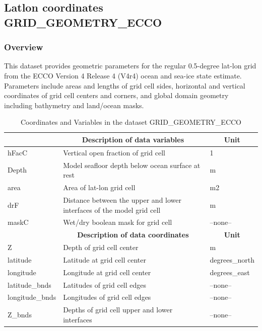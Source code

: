 \subsection{Latlon coordinates GRID\_GEOMETRY\_ECCO}
\newp
\subsubsection{Overview}
This dataset provides geometric parameters for the regular 0.5-degree lat-lon grid from the ECCO Version 4 Release 4 (V4r4) ocean and sea-ice state estimate. Parameters include areas and lengths of grid cell sides, horizontal and vertical coordinates of grid cell centers and corners, and global domain geometry including bathymetry and land/ocean masks. 
\begin{longtable}{|m{}|m{}|m{}|}
\caption{Coordinates and Variables in the dataset GRID\_GEOMETRY\_ECCO}
\label{tab:table-GRID_GEOMETRY_ECCO-fields} \\ 
\hline \endhead \hline \endfoot
\rowcolor{lightgray} \multicolumn{1}{|c|}{\textbf{Variables}} & \multicolumn{1}{|c|}{\textbf{Description of data variables}} &  \multicolumn{1}{|c|}{\textbf{Unit}}\\ \hline
hFacC &Vertical open fraction of grid cell &1  \\ \hline
Depth &Model seafloor depth below ocean surface at rest &m  \\ \hline
area &Area of lat-lon grid cell &m2  \\ \hline
drF &Distance between the upper and lower interfaces of the model grid cell &m  \\ \hline
maskC &Wet/dry boolean mask for grid cell &--none--  \\ \hline
\rowcolor{lightgray} \multicolumn{1}{|c|}{\textbf{Coordinates}} & \multicolumn{1}{|c|}{\textbf{Description of data coordinates}} &  \multicolumn{1}{|c|}{\textbf{Unit}}\\ \hline
Z &Depth of grid cell center &m  \\ \hline
latitude &Latitude at grid cell center &degrees\_north  \\ \hline
longitude &Longitude at grid cell center &degrees\_east  \\ \hline
latitude\_bnds &Latitudes of grid cell edges &--none--  \\ \hline
longitude\_bnds &Longitudes of grid cell edges &--none--  \\ \hline
Z\_bnds &Depths of grid cell upper and lower interfaces &--none--  \\ \hline
\end{longtable}

